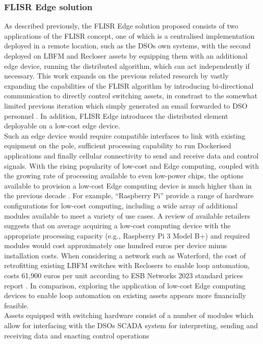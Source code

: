 \subsubsection{FLISR Edge solution}
\label{sec:flisr_edge}

\noindent As described previously, the FLISR Edge solution proposed consists of two applications of the FLISR concept, one of which is a centralised implementation deployed in a remote location, such
as the DSOs own systems, with the second deployed on LBFM and Recloser assets by equipping them with an additional edge device, running the distributed algorithm, which can act independently if necessary.
This work expands on the previous related research by vastly expanding the capabilities of the FLISR algorithm by introducing bi-directional communication to directly control switching assets, in constrast
to the somewhat limited previous iteration which simply generated an email forwarded to DSO personnel \cite{10.12688/openreseurope.14115.2}. In addition, FLISR Edge introduces the distributed element deployable on a low-cost edge device.
\\
Such an edge device would require compatible interfaces to link with existing equipment on the pole, sufficient processing capability to run Dockerised applications and finally cellular connectivity to
send and receive data and control signals. With the rising popularity of low-cost and Edge computing, coupled with the growing rate of processing available to even low-power chips, the options available
to provision a low-cost Edge computing device is much higher than in the previous decade \cite{8016573}. For example, ``Raspberry Pi'' provide a range of hardware configurations
for low-cost computing, including a wide array of additional modules available to meet a variety of use cases. A review of available retailers suggests that
on average acquiring a low-cost computing device with the appropriate processing capacity (e.g., Raspberry Pi 3 Model B+) and required modules would cost approximately one hundred euros per device minus installation costs.
When considering a network such as Waterford, the cost of retrofitting existing LBFM switches with Reclosers to enable loop automation, costs 61,900 euros per unit according to ESB Networks 2023 standard prices report \cite{Networks_2023}.
In comparison, exploring the application of low-cost Edge computing devices to enable loop automation on existing assets appears more financially feasible.
\\
Assets equipped with switching hardware consist of a number of modules which allow for interfacing with the DSOs SCADA system for interpreting, sending and receiving data and enacting control operations
